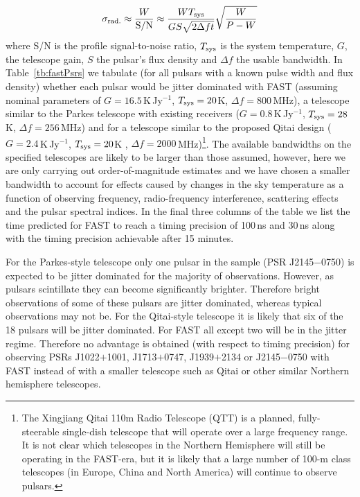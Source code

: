 \documentclass{raa}            %
\begin{document}
\begin{equation}
\sigma_{\rm rad.} \approx \frac{W}{\rm S/N} \approx \frac{W T_{\rm sys}}{GS\sqrt{2\Delta ft}}\sqrt{\frac{W}{P-W}}
\end{equation}
where S/N is the profile signal-to-noise ratio, $T_{\rm sys}$ is the system temperature, $G$, the telescope gain, $S$ the pulsar's flux density and $\Delta f$ the usable bandwidth.  In Table~\ref{tb:fastPsrs} we tabulate (for all pulsars with a known pulse width and flux density) whether each pulsar would be jitter dominated with FAST (assuming nominal parameters of $G=16.5$\,K\,Jy$^{-1}$, $T_{\rm sys} = 20$K, $\Delta f = 800$\,MHz), a telescope similar to the Parkes telescope with existing receivers ($G=0.8$\,K\,Jy$^{-1}$, $T_{\rm sys} = 28$K, $\Delta f = 256$\,MHz) and for a telescope similar to the proposed Qitai design ($G=2.4$\,K\,Jy$^{-1}$, $T_{\rm sys} = 20$K , $\Delta f = 2000$\,MHz)\footnote{The Xingjiang Qitai 110m Radio Telescope (QTT) is a planned, fully-steerable single-dish telescope that will operate over a large frequency range.  It is not clear which telescopes in the Northern Hemisphere will still be operating in the FAST-era, but it is likely that a large number of 100-m class telescopes  (in Europe, China and North America) will continue to observe pulsars.}. The available bandwidths on the specified telescopes are likely to be larger than those assumed, however, here we are only carrying out order-of-magnitude estimates and we have chosen a smaller bandwidth to account for effects caused by changes in the sky temperature as a function of observing frequency, radio-frequency interference, scattering effects and the pulsar spectral indices.  In the final three columns of the table we list the time predicted for FAST to reach a timing precision of 100\,ns and 30\,ns along with the timing precision achievable after 15 minutes. 

For the Parkes-style telescope only one pulsar in the sample (PSR J2145$-$0750) is expected to be jitter dominated for the majority of observations. However, as pulsars scintillate they can become significantly brighter.  Therefore bright observations of some of these pulsars are jitter dominated, whereas typical observations may not be.  For the Qitai-style telescope it is likely that six of the 18 pulsars will be jitter dominated.   For FAST all except two will be in the jitter regime.  Therefore no advantage is obtained (with respect to timing precision) for observing PSRs J1022$+$1001,  J1713$+$0747, J1939$+$2134 or J2145$-$0750 with FAST instead of with a smaller telescope such as Qitai or other similar Northern hemisphere telescopes.
\end{document}
